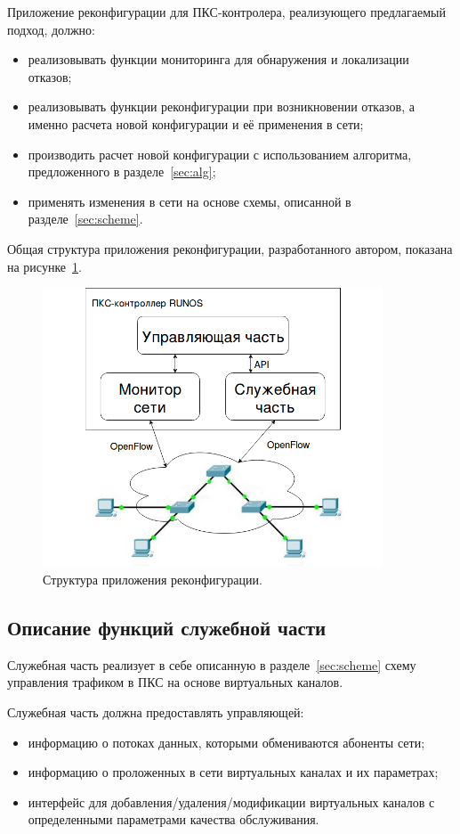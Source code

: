 \documentclass[12pt, a4paper]{article}
\begin{document}
Приложение реконфигурации для ПКС-контролера, реализующего предлагаемый подход, должно:
\begin{itemize}
	\item реализовывать функции мониторинга для обнаружения и локализации отказов;
	\item реализовывать функции реконфигурации при возникновении отказов, а именно расчета новой конфигурации и её применения в сети;
	\item производить расчет новой конфигурации с использованием алгоритма, предложенного в разделе~\ref{sec:alg};
	\item применять изменения в сети на основе схемы, описанной в разделе~\ref{sec:scheme}.
\end{itemize}

Общая структура приложения реконфигурации, разработанного автором, показана на рисунке~\ref{pic:netcontrol}.

\begin{figure}[h!]
	\centering
	\includegraphics[width=0.90\textwidth]{img/netcontrol.png}
	\caption{Структура приложения реконфигурации.}
	\label{pic:netcontrol}
\end{figure}

\FloatBarrier
\subsection{Описание функций служебной части}
Служебная часть реализует в себе описанную в разделе~\ref{sec:scheme} схему управления трафиком в ПКС на основе виртуальных каналов.
 
Служебная часть должна предоставлять управляющей:
\begin{itemize}
	\item информацию о потоках данных, которыми обмениваются абоненты сети;
	\item информацию о проложенных в сети виртуальных каналах и их параметрах;
	\item интерфейс для добавления/удаления/модификации виртуальных каналов с определенными параметрами качества обслуживания.
\end{itemize}
\end{document}
